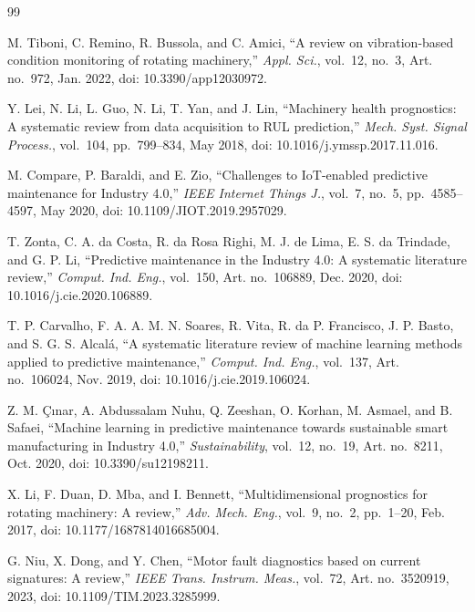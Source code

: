 \documentclass[10pt,twocolumn]{article}
\begin{document}
\balance
\renewcommand{\refname}{Referencias bibliográficas}
\begin{thebibliography}{99}
\footnotesize
\setlength{\itemsep}{1pt}

M. Tiboni, C. Remino, R. Bussola, and C. Amici, ``A review on vibration-based condition
monitoring of rotating machinery,'' \emph{Appl. Sci.}, vol.~12, no.~3, Art. no.~972, Jan. 2022,
doi: 10.3390/app12030972.

Y. Lei, N. Li, L. Guo, N. Li, T. Yan, and J. Lin, ``Machinery health prognostics: A systematic
review from data acquisition to RUL prediction,'' \emph{Mech. Syst. Signal Process.}, vol.~104,
pp.~799--834, May 2018, doi: 10.1016/j.ymssp.2017.11.016.

M. Compare, P. Baraldi, and E. Zio, ``Challenges to IoT-enabled predictive maintenance for
Industry 4.0,'' \emph{IEEE Internet Things J.}, vol.~7, no.~5, pp.~4585--4597, May 2020,
doi: 10.1109/JIOT.2019.2957029.

T. Zonta, C. A. da Costa, R. da Rosa Righi, M. J. de Lima, E. S. da Trindade, and G. P. Li,
``Predictive maintenance in the Industry 4.0: A systematic literature review,'' \emph{Comput. Ind.
Eng.}, vol.~150, Art. no.~106889, Dec. 2020, doi: 10.1016/j.cie.2020.106889.

T. P. Carvalho, F. A. A. M. N. Soares, R. Vita, R. da P. Francisco, J. P. Basto, and
S. G. S. Alcalá, ``A systematic literature review of machine learning methods applied to
predictive maintenance,'' \emph{Comput. Ind. Eng.}, vol.~137, Art. no.~106024, Nov. 2019,
doi: 10.1016/j.cie.2019.106024.

Z. M. \c{C}{\i}nar, A. Abdussalam Nuhu, Q. Zeeshan, O. Korhan, M. Asmael, and B. Safaei, ``Machine
learning in predictive maintenance towards sustainable smart manufacturing in Industry 4.0,''
\emph{Sustainability}, vol.~12, no.~19, Art. no.~8211, Oct. 2020, doi: 10.3390/su12198211.

X. Li, F. Duan, D. Mba, and I. Bennett, ``Multidimensional prognostics for rotating machinery: A
review,'' \emph{Adv. Mech. Eng.}, vol.~9, no.~2, pp.~1--20, Feb. 2017,
doi: 10.1177/1687814016685004.

G. Niu, X. Dong, and Y. Chen, ``Motor fault diagnostics based on current signatures: A review,''
\emph{IEEE Trans. Instrum. Meas.}, vol.~72, Art. no.~3520919, 2023,
doi: 10.1109/TIM.2023.3285999.


\end{thebibliography}
\end{document}
